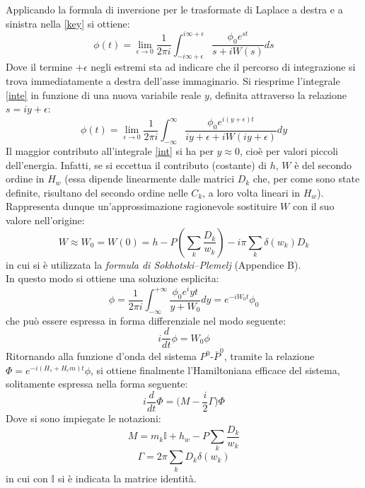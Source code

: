 Applicando la formula di inversione per le trasformate di Laplace a destra e a sinistra nella \eqref{key} si ottiene:
 \begin{equation}\label{inte}
 \phi(t) = \lim_{\epsilon\longrightarrow0}\frac{1}{2\pi i}\int_{-i\infty + \epsilon}^{i\infty + \epsilon} \frac{\phi_0e^{st}}{s+iW(s)}ds
 \end{equation}
Dove il termine $+\epsilon$ negli estremi sta ad indicare che il percorso di integrazione si trova immediatamente a destra dell'asse immaginario.
Si riesprime l'integrale \eqref{inte} in funzione di una nuova variabile reale $y$, definita attraverso la relazione $s = iy + \epsilon$:
\begin{equation}\label{int}
   \phi(t) = \lim_{\epsilon\longrightarrow0}\frac{1}{2\pi i}\int_{-\infty}^{\infty} \frac{\phi_0e^{i(y + \epsilon)t}}{iy + \epsilon+iW(iy + \epsilon)}dy
\end{equation}
Il maggior contributo all'integrale \eqref{int} si ha per $y\approx0$, cioè per valori piccoli dell'energia. 
Infatti, se si eccettua il contributo (costante) di $h$, $W$ è del secondo ordine in $H_w$ (essa dipende linearmente dalle 
matrici $D_k$ che, per come sono state definite, risultano del secondo ordine nelle $C_k$, a loro volta lineari in $H_w$).
Rappresenta dunque un'approssimazione ragionevole sostituire $W$ con il suo valore nell'origine:
\begin{equation}
 W\approx W_0 = W(0) = h - P(\sum_{k}\frac{D_k}{w_k}) - i\pi\sum_{k}\delta(w_k)D_k
\end{equation}
in cui si \`e utilizzata la \emph{formula di Sokhotski–Plemelj} (Appendice B).\\
In questo modo si ottiene una soluzione esplicita:
\begin{equation}
\phi = \frac{1}{2\pi i}\int_{-\infty}^{+\infty} \frac{\phi_0e^iyt}{y + W_0}dy = e^{-iW_0t} \phi_0
\end{equation}
che pu\`o essere espressa in forma differenziale nel modo seguente:
\begin{equation}
 i\frac{d}{dt}\phi = W_0\phi
\end{equation}
Ritornando alla funzione d'onda del sistema $P^0$-$\bar{P}^0$, tramite la relazione $\Phi = e^{-i(H_s + H_em)t}\phi$, si ottiene finalmente l'Hamiltoniana efficace del sistema, solitamente espressa nella forma seguente:
\begin{equation}
 i\frac{d}{dt}\Phi = \Bigg(M-\frac{i}{2}\Gamma\Bigg)\Phi 
\end{equation}
Dove si sono impiegate le notazioni:
\begin{equation}
M = m_k \mathbb{I} + h_w -P\sum_{k}\frac{D_k}{w_k}
\end{equation}
\begin{equation}
 \Gamma = 2\pi\sum_{k}D_k\delta(w_k)
\end{equation}
in cui con $\mathbb{I}$ si è indicata la matrice identità.

